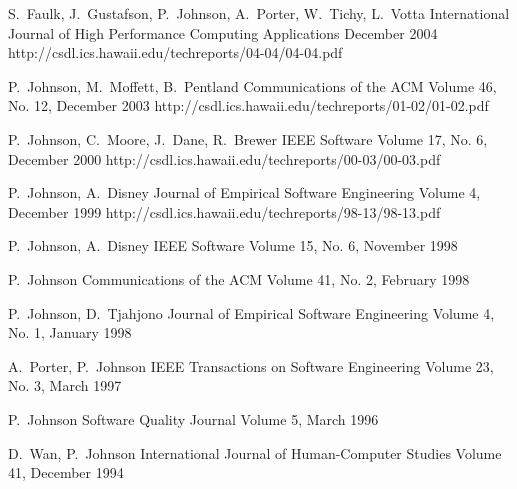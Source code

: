 \documentclass[11pt,letterpaper,sans]{moderncv} %
\begin{document}
          {S.~Faulk, J.~Gustafson, P.~Johnson, A.~Porter, W.~Tichy, L.~Votta}
          {International Journal of High Performance Computing Applications}
          {December 2004}
          {http://csdl.ics.hawaii.edu/techreports/04-04/04-04.pdf}

          {P.~Johnson, M.~Moffett, B.~Pentland}
          {Communications of the ACM}
          {Volume 46, No. 12, December 2003}
          {http://csdl.ics.hawaii.edu/techreports/01-02/01-02.pdf}

          {P.~Johnson, C.~Moore, J.~Dane, R.~Brewer}
          {IEEE Software}
          {Volume 17, No. 6, December 2000}
          {http://csdl.ics.hawaii.edu/techreports/00-03/00-03.pdf}

          {P.~Johnson, A.~Disney}
          {Journal of Empirical Software Engineering}
          {Volume 4, December 1999}
          {http://csdl.ics.hawaii.edu/techreports/98-13/98-13.pdf}

          {P.~Johnson, A.~Disney}
          {IEEE Software}
          {Volume 15, No. 6, November 1998}

          {P.~Johnson}
          {Communications of the ACM}
          {Volume 41, No. 2, February 1998}

          {P.~Johnson, D.~Tjahjono}
          {Journal of Empirical Software Engineering}
          {Volume 4, No. 1, January 1998}

          {A.~Porter, P.~Johnson}
          {IEEE Transactions on Software Engineering}
          {Volume 23, No. 3, March 1997}

          {P.~Johnson}
          {Software Quality Journal}
          {Volume 5, March 1996}

          {D.~Wan, P.~Johnson}
          {International Journal of Human-Computer Studies}
          {Volume 41, December 1994}
\end{document}
